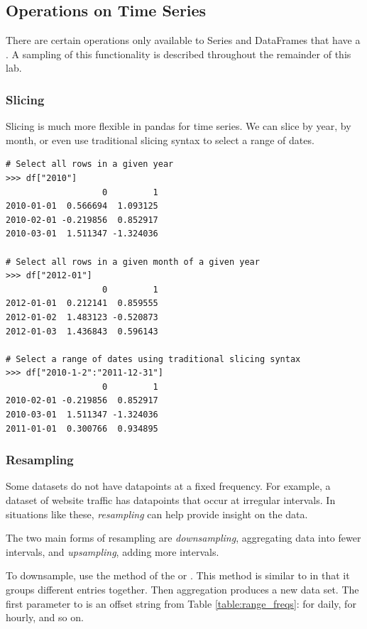 \subsection*{Operations on Time Series}

There are certain operations only available to Series and DataFrames that have a . A sampling of this functionality is described throughout the remainder of this lab.
\subsubsection*{Slicing}

Slicing is much more flexible in pandas for time series. We can slice by year, by month, or even use traditional slicing syntax to select a range of dates.

\begin{lstlisting}
# Select all rows in a given year
>>> df["2010"]
                   0         1
2010-01-01  0.566694  1.093125
2010-02-01 -0.219856  0.852917
2010-03-01  1.511347 -1.324036

# Select all rows in a given month of a given year
>>> df["2012-01"]
                   0         1
2012-01-01  0.212141  0.859555
2012-01-02  1.483123 -0.520873
2012-01-03  1.436843  0.596143

# Select a range of dates using traditional slicing syntax
>>> df["2010-1-2":"2011-12-31"]
                   0         1
2010-02-01 -0.219856  0.852917
2010-03-01  1.511347 -1.324036
2011-01-01  0.300766  0.934895
\end{lstlisting}

\subsubsection*{Resampling} %

Some datasets do not have datapoints at a fixed frequency.
For example, a dataset of website traffic has datapoints that occur at irregular intervals.
In situations like these, \emph{resampling} can help provide insight on the data.

The two main forms of resampling are \emph{downsampling}, aggregating data into fewer intervals, and \emph{upsampling}, adding more intervals.

To downsample, use the  method of the  or .
This method is similar to  in that it groups different entries together.
Then aggregation produces a new data set.
The first parameter to  is an offset string from Table \ref{table:range_freqs}:  for daily,  for hourly, and so on.

